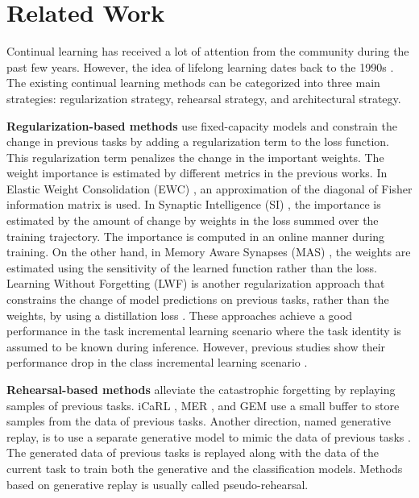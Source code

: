 \documentclass[letterpaper]{article} %
\begin{document}
\section{Related Work}
Continual learning has received a lot of attention from the community during the past few years. However, the idea of lifelong learning dates back to the 1990s \cite{thrun1998lifelong,thrun1995lifelong}. The existing continual learning methods can be categorized into three main strategies: regularization strategy, rehearsal strategy, and architectural strategy.

\textbf{Regularization-based methods} use fixed-capacity models and constrain the change in previous tasks by adding a regularization term to the loss function. This regularization term penalizes the change in the important weights. The weight importance is estimated by different metrics in the previous works. In Elastic Weight Consolidation (EWC) \cite{kirkpatrick2017overcoming}, an approximation of the diagonal of Fisher information matrix is used. In Synaptic Intelligence (SI) \cite{zenke2017continual}, the importance is estimated by the amount of change by weights in the loss summed over the training trajectory. The importance is computed in an online manner during training. On the other hand, in Memory Aware Synapses (MAS) \cite{aljundi2018memory}, the weights are estimated using the sensitivity of the learned function rather than the loss. Learning Without Forgetting (LWF) \cite{li2017learning} is another regularization approach that constrains the change of model predictions on previous tasks, rather than the weights, by using a distillation loss \cite{hinton2015distilling}. These approaches achieve a good performance in the task incremental learning scenario where the task identity is assumed to be known during inference. However, previous studies show their performance drop in the class incremental learning scenario \cite{kemker2018measuring,Hsu18_EvalCL,Farquhar2019a,VanDeVen2018a}.

\textbf{Rehearsal-based methods} alleviate the catastrophic forgetting by replaying samples of previous tasks. iCaRL \cite{rebuffi2017icarl}, MER \cite{riemer2018learning}, and GEM \cite{lopez2017gradient} use a small buffer to store samples from the data of previous tasks. Another direction, named generative replay, is to use a separate generative model to mimic the data of previous tasks \cite{shin2017continual,mocanu2016online}. The generated data of previous tasks is replayed along with the data of the current task to train both the generative and the classification models. Methods based on generative replay is usually called pseudo-rehearsal.
\end{document}
